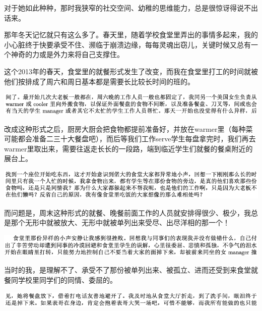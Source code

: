 \documentclass[9pt, b5paper]{article}
\begin{document}
对于她如此种种，那时我狭窄的社交空间、幼稚的思维能力，总是很惊讶得说不出话来。

那年冬天记忆就只有这么多了。春天里，随着学校食堂里弄出的事情多起来，我的小心脏终于快要承受不住、濒临于崩溃边缘，每每灵魂出窃儿，关键时候又总有一个神奇的力或是外力来将自己支撑住。

这个2013年的春天，食堂里的就餐形式发生了改变，而我在食堂里打工的时间就被他们按排成了周六和周日基本都是需要长比较长时间的班的。 

\begin{center}
\includegraphics[width=.9\linewidth]{./pic/backups_plans_20210503_221236.png}
\end{center}

改成这种形式之后，厨房大厨会把食物都提前准备好，并放在warmer里（每种菜可能都会准备二三十大餐盘吧），而后等我们工作serve学生每盘拿完时，我们再去warmer里取出来，需要往返走长长的一段路，端到临近学生们就餐的餐桌附近的展台上。 

\begin{center}
\includegraphics[width=.9\linewidth]{./pic/backups_plans_20210503_221559.png}
\end{center}

而问题是，周末这种形式的就餐、晚餐前面工作的人员就安排得很少、极少，我总是那个无形中就被放大、无形中就被单列出来受尽、出尽洋相的那一个！

\begin{center}
\includegraphics[width=.9\linewidth]{./pic/backups_plans_20210503_221808.png}
\end{center}

当时的我，是理解不了、承受不了那份被单列出来、被孤立、进而还受到来食堂就餐同学校里同学们的同情、委屈的。

\begin{center}
\includegraphics[width=.9\linewidth]{./pic/backups_plans_20210503_221858.png}
\end{center}
\end{document}
